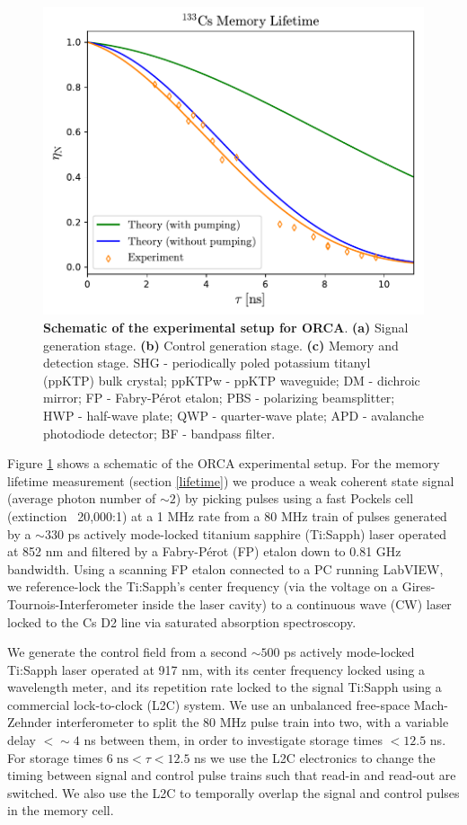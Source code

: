 \begin{figure}[h!]
\includegraphics[width=\textwidth]{doppler_dephasing_cs3.pdf} %
\caption{\textbf{Schematic of the experimental setup for ORCA}. \textbf{(a) }  Signal generation stage. \textbf{(b) } Control generation stage. \textbf{(c) } Memory and detection stage. SHG - periodically poled potassium titanyl (ppKTP) bulk crystal; ppKTPw - ppKTP waveguide; DM - dichroic mirror; FP - Fabry-P\'erot etalon; PBS - polarizing beamsplitter; HWP - half-wave plate; QWP - quarter-wave plate; APD - avalanche photodiode detector; BF - bandpass filter.}\label{fig:figSup1}
\end{figure}

Figure \ref{fig:figSup1} shows a schematic of the ORCA experimental setup. For the memory lifetime measurement (section \ref{lifetime}) we produce a weak coherent state signal (average photon number of $\sim2$) by picking pulses using a fast Pockels cell (extinction ~20,000:1) at a 1 MHz rate from a 80 MHz train of pulses generated by a $\sim330$ ps actively mode-locked titanium sapphire (Ti:Sapph) laser operated at 852 nm and filtered by a Fabry-P\'erot (FP) etalon down to 0.81 GHz bandwidth. Using a scanning FP etalon connected to a PC running LabVIEW, we reference-lock the Ti:Sapph's center frequency (via the voltage on a Gires-Tournois-Interferometer inside the laser cavity) to a continuous wave (CW) laser locked to the Cs D2 line via saturated absorption spectroscopy. 

We generate the control field from a second $\sim500$ ps actively mode-locked Ti:Sapph laser operated at 917 nm, with its center frequency locked using a wavelength meter, and its repetition rate locked to the signal Ti:Sapph using a commercial lock-to-clock (L2C) system. We use an unbalanced free-space Mach-Zehnder interferometer to split the 80 MHz pulse train into two, with a variable delay $<\sim4$ ns between them, in order to investigate storage times $<12.5$ ns. For storage times $6\;\mathrm{ns}<\tau<12.5$ ns we use the L2C electronics to change the timing between signal and control pulse trains such that read-in and read-out are switched. We also use the L2C to temporally overlap the signal and control pulses in the memory cell.

